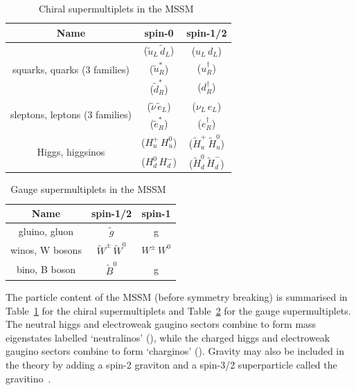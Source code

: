 \begin{table}[!h]
  \centering
  \caption{Chiral supermultiplets in the MSSM~\cite{SUSYP}}
  \label{tab:chiral}
  \begin{tabular}
    {ccc}
    \hline\hline
    Name& spin-0 & spin-1/2 \\
    \hline
    \multirow{3}{*}{squarks, quarks (3 families) }& ($\tilde{u}_L\,\tilde{d}_L$) & ($u_L\,d_L$) \\
    & ($\tilde{u}^{*}_R$) & ($u_R^{\dagger}$) \\
    & ($\tilde{d}^{*}_R$) & ($d_R^{\dagger}$) \\
    \hline
    \multirow{2}{*}{sleptons, leptons (3 families) }& ($\tilde{\nu}\,\tilde{e}_L$) & ($\nu_L\,e_L$) \\
    & ($\tilde{e}^{*}_R$) & ($e_R^{\dagger}$) \\
    \hline
    \multirow{2}{*}{Higgs, higgsinos}& ($H_u^{+}\,H_u^{0}$) &  ($\tilde{H}_u^{+}\,\tilde{H}_u^{0}$) \\
    & ($H_d^{0}\,H_d^{-}$) &  ($\tilde{H}_d^{0}\,\tilde{H}_d^{-}$) \\
  \end{tabular}
\end{table}

\begin{table}[!h]
  \centering
  \caption{Gauge supermultiplets in the MSSM~\cite{SUSYP}}
  \label{tab:vector}
  \begin{tabular}
    {ccc}
    \hline\hline
    Name& spin-1/2 & spin-1 \\
    \hline
    gluino, gluon & $\tilde{g}$ & g \\
    winos, W bosons & $\tilde{W}^{\pm}\,\tilde{W}^0$ & $W^{\pm}\,W^{0}$ \\
    bino, B boson & $\tilde{B}^0$ & g \\
  \end{tabular}
\end{table}

The particle content of the MSSM (before symmetry breaking) 
is summarised in Table~\ref{tab:chiral} for the chiral supermultiplets
and Table~\ref{tab:vector} for the gauge supermultiplets. The neutral higgs and electroweak 
gaugino sectors combine to form mass eigenstates labelled `neutralinos' 
(\chiz), while the charged higgs and electroweak gaugino sectors combine
to form `charginos' (\chip). Gravity may also be included in the theory
by adding a spin-2 graviton and a spin-3/2 superparticle
called the gravitino~\cite{SUSYP}. 


